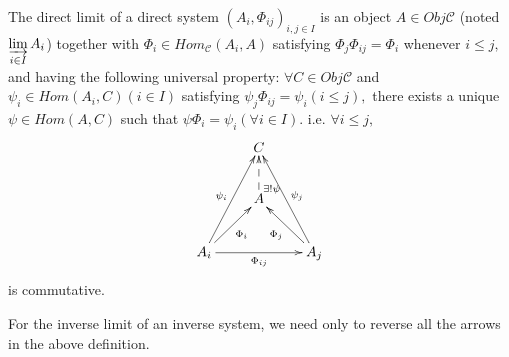 \begin{Def}
The direct limit of a direct system $(A_i,\Phi_{ij})_{i,j\in I}$ is
an object $A\in Obj\mathscr{C}$ (noted $\varinjlim\limits_{i\in
I}A_i$) together with $\Phi_i\in Hom_{\mathscr{C}}(A_i,A)$
satisfying $\Phi_j\Phi_{ij}=\Phi_i$ whenever $i\leqslant j,$ and
having the following universal property: $\forall C\in
Obj\mathscr{C}$ and $\psi_i\in Hom(A_i,C)(i\in I)$ satisfying
$\psi_j\Phi_{ij}=\psi_i(i\leqslant j),$ there exists a unique
$\psi\in Hom(A,C)$ such that $\psi\Phi_i=\psi_i(\forall i\in I).$
i.e. $\forall i\leqslant j,$
\[ \xymatrix{
   & C \\
   & A \ar@{-->}[u]_(.2){\exists!\psi} \\
   A_i \ar"1,2"^{\psi_i} \ar[ur]_{\Phi_i} \ar[rr]_{\Phi_{ij}} & &
   A_j \ar"1,2"_{\psi_j} \ar[ul]^{\Phi_j} }  \]
is commutative.

For the inverse limit of an inverse system, we need only to reverse
all the arrows in the above definition.
\end{Def}
